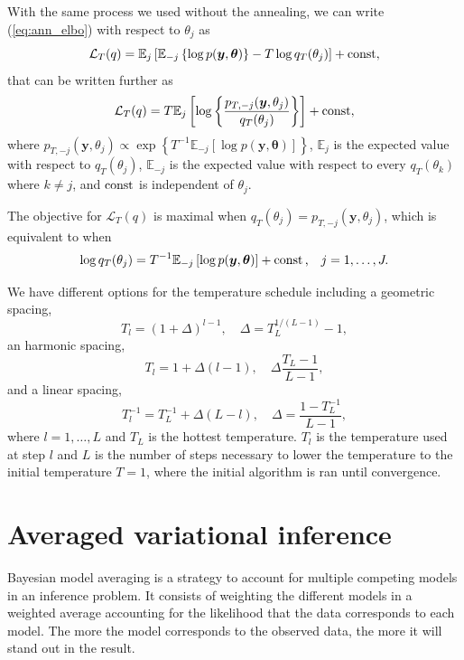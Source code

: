 \documentclass[a4paper, 11pt]{report}
\numberwithin{equation}{chapter}
\DeclareMathOperator*{\const}{{\rm const}}
\begin{document}
With the same process we used without the annealing, we can write (\ref{eq:ann_elbo}) with respect to $\theta_j$ as
\begin{equation*}
\mathcal{L}_T(q) = \mathbb{E}_j\left[\mathbb{E}_{-j}\left\lbrace \log p(\boldsymbol{y},\boldsymbol{\theta})\right\rbrace - T \log q_T(\theta_j)\right]+ \const,
\end{equation*}
that can be written further as
\begin{equation*}
\mathcal{L}_T(q) = T\mathbb{E}_j\left[\log\left\lbrace\frac{p_{T, -j}(\boldsymbol{y}, \theta_j)}{q_T(\theta_j)}\right\rbrace\right] + \const,	
\end{equation*}
where $p_{T, -j}(\boldsymbol{y},\theta_j) \propto \exp\left\lbrace T^{-1}\mathbb{E}_{-j}\left[\log p(\boldsymbol{y},\boldsymbol{\theta})\right]\right\rbrace$, $\mathbb{E}_j$ is the expected value with respect to $q_T(\theta_j)$, $\mathbb{E}_{-j}$ is the expected value with respect to every $ q_T(\theta_k)$ where $k \neq j$, and $\const$ is independent of $\theta_j$.

The objective for $\mathcal{L}_T(q)$ is maximal when $q_T(\theta_j) = p_{T,-j}(\boldsymbol{y},\theta_j)$, which is equivalent to when
\begin{equation*}
\log q_T(\theta_j) = T^{-1} \mathbb{E}_{-j}\left[\log p(\boldsymbol{y}, \boldsymbol{\theta})\right] + \const\text{,}\quad j=1,\dots,J.
\end{equation*}

We have different options for the temperature schedule including a geometric spacing,
\begin{equation*}
T_l = (1 + \Delta)^{l-1},\quad \Delta = T_L^{1/(L-1)}-1,
\end{equation*}
an harmonic spacing,
\begin{equation*}
T_l = 1 + \Delta(l-1), \quad \Delta \frac{T_L-1}{L-1},
\end{equation*}
and a linear spacing,
\begin{equation*}
T_l^{-1} = T_L^{-1} + \Delta (L-l), \quad \Delta = \frac{1-T_L^{-1}}{L-1},
\end{equation*}
where $l = 1,\dots,L$ and $T_L$ is the hottest temperature. $T_l$ is the temperature used at step $l$ and $L$ is the number of steps necessary to lower the temperature to the initial temperature $T = 1$, where the initial algorithm is ran until convergence.
\section{Averaged variational inference}
Bayesian model averaging is a strategy to account for multiple competing models in an inference problem. It consists of weighting the different models in a weighted average accounting for the likelihood that the data corresponds to each model. The more the model corresponds to the observed data, the more it will stand out in the result.
\end{document}

